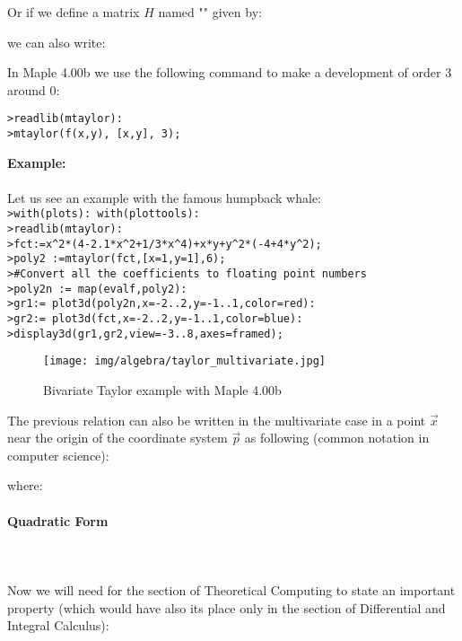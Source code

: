 	Or if we define a matrix $H$ named "\label{hessian matrix}" given by:
	
	we can also write:
	
	In Maple 4.00b we use the following command to make a development of order $3$ around $0$:
	
	\texttt{>readlib(mtaylor):\\
	>mtaylor(f(x,y), [x,y], 3);}
	
	\begin{tcolorbox}[colframe=black,colback=white,sharp corners]
	\textbf{{\Large {}}Example:}\\\\
	Let us see an example with the famous humpback whale:\\
	
	\texttt{>with(plots): with(plottools):\\
	>readlib(mtaylor):\\
	>fct:=x\string^2*(4-2.1*x\string^2+1/3*x\string^4)+x*y+y\string^2*(-4+4*y\string^2);\\
	>poly2 :=mtaylor(fct,[x=1,y=1],6);\\
	>\#Convert all the coefficients to floating point numbers\\
	>poly2n := map(evalf,poly2):\\
	>gr1:= plot3d(poly2n,x=-2..2,y=-1..1,color=red):\\
	>gr2:= plot3d(fct,x=-2..2,y=-1..1,color=blue):\\
	>display3d({gr1,gr2},view=-3..8,axes=framed);
	}
	\begin{figure}[H]
		\centering
		\texttt{[image: img/algebra/taylor\_multivariate.jpg]}
		\caption{Bivariate Taylor example with Maple 4.00b}
	\end{figure}
	\end{tcolorbox}
	
	The previous relation can also be written in the multivariate case in a point $\vec{x}$ near the origin of the coordinate system $\vec{p}$ as following (common notation in computer science):
	
	where:
	
	
	\pagebreak
	\paragraph{Quadratic Form}\mbox{}\\\\
	Now we will need for the section of Theoretical Computing to state an important property (which would have also its place only in the section of Differential and Integral Calculus):
	
